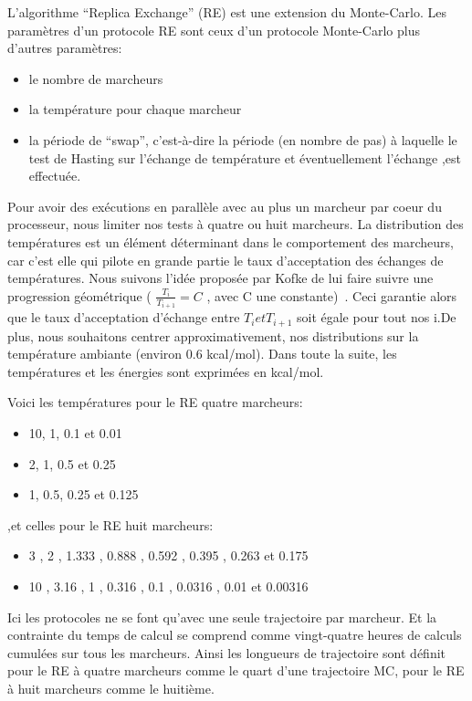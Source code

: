 L'algorithme ``Replica Exchange'' (RE) est une extension du Monte-Carlo. Les paramètres d'un protocole RE sont ceux d'un protocole Monte-Carlo plus d'autres paramètres:

\begin{itemize}
\item le nombre de marcheurs
\item la température pour chaque marcheur
\item la période de ``swap'', c'est-à-dire la période  (en nombre de pas) à  laquelle le test de Hasting sur l'échange de température et éventuellement l'échange ,est effectuée.
\end{itemize}
Pour avoir des exécutions en parallèle avec au plus un marcheur par coeur du processeur, nous limiter nos tests à quatre ou huit marcheurs.
La distribution des températures est un élément déterminant dans le comportement des marcheurs, car c'est elle qui pilote en grande partie le taux d'acceptation des échanges de températures. Nous suivons l'idée proposée par Kofke de lui faire suivre une progression géométrique ( $ \frac{T_i}{T_{i+1}}=C $ , avec C une constante)~\citep{refRE1,refRE2,refRE3}. Ceci garantie alors que le taux d'acceptation d'échange entre $T_i et T_{i+1}$ soit égale pour tout nos i.De plus, nous souhaitons centrer approximativement, nos distributions sur la température ambiante (environ 0.6 kcal/mol). Dans toute la suite, les températures et les énergies sont exprimées en kcal/mol.

Voici les températures pour le RE quatre marcheurs:

\begin{itemize} 
\item 10, 1, 0.1 et 0.01
\item 2, 1, 0.5 et 0.25 
\item 1, 0.5, 0.25 et 0.125
\end{itemize} 

,et celles pour le RE huit marcheurs:

\begin{itemize} 
\item 3 , 2 , 1.333 , 0.888 , 0.592 , 0.395 , 0.263 et 0.175 
\item 10 , 3.16 , 1 , 0.316 , 0.1 , 0.0316 , 0.01 et 0.00316
\end{itemize} 

Ici les protocoles ne se font qu'avec une seule trajectoire par marcheur. Et la contrainte du temps de calcul se comprend comme vingt-quatre heures de calculs cumulées sur tous les marcheurs.
Ainsi les longueurs de trajectoire sont définit pour le RE à quatre marcheurs comme le quart d'une trajectoire MC, pour le RE à huit marcheurs comme le huitième.

